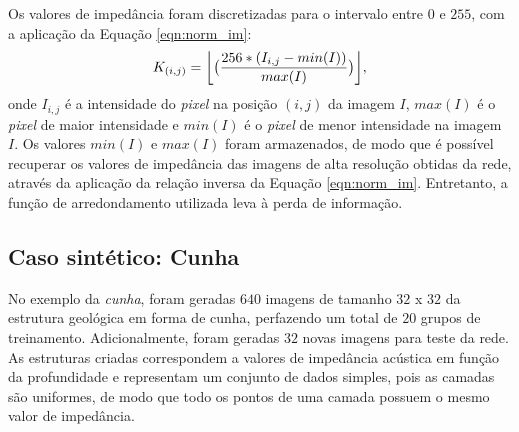 Os valores de impedância foram discretizadas para o intervalo entre $0$ e $255$, com a aplicação da Equação \ref{eqn:norm_im}:
\begin{equation}
 K_{(i,j)} = \floor*{\big( \frac{256*(I_{i,j} - min(I))}{max(I)} \big)},
\label{eqn:norm_im}
 \end{equation}
onde $I_{i,j}$ é a intensidade do \textit{pixel} na posição $(i,j)$ da imagem $I$,
$max(I)$ é o \textit{pixel} de maior intensidade e $min(I)$ é o \textit{pixel} de menor intensidade
na imagem $I$. Os valores $min(I)$ e $max(I)$ foram armazenados, de modo que é
possível recuperar os valores de impedância das imagens de alta resolução obtidas da rede,
através da aplicação da relação inversa da Equação \ref{eqn:norm_im}. Entretanto,
a função de arredondamento utilizada leva à perda de informação.

\subsection{Caso sintético: Cunha}
No exemplo da \textit{cunha}, foram geradas $640$ imagens de tamanho $32$ x $32$ da estrutura geológica em forma
de cunha, perfazendo um total de $20$ grupos de treinamento. Adicionalmente, foram geradas $32$
novas imagens para teste da rede. As estruturas criadas correspondem a valores de impedância
acústica em função da profundidade e representam um conjunto de dados simples, pois as camadas são uniformes,
de modo que todo os pontos de uma camada possuem o mesmo valor de impedância.

